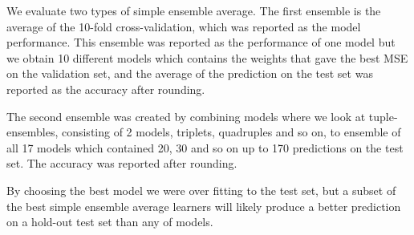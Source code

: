 \documentclass[10pt,letterpaper]{article}
\begin{document}
We evaluate two types of simple ensemble average. The first ensemble is the average of the 10-fold cross-validation, which was reported as the model performance. This ensemble was reported as the performance of one model but we obtain 10 different models which contains the weights that gave the best MSE on the validation set, and the average of the prediction on the test set was reported as the accuracy after rounding.

The second ensemble was created by combining models where we look at tuple-ensembles, consisting of 2 models, triplets, quadruples and so on, to ensemble of all 17 models which contained 20, 30 and so on up to 170 predictions on the test set. The accuracy was reported after rounding. 

By choosing the best model we were over fitting to the test set, but a subset of the best simple ensemble average learners will likely produce a better prediction on a hold-out test set than any of models.






\end{document}
